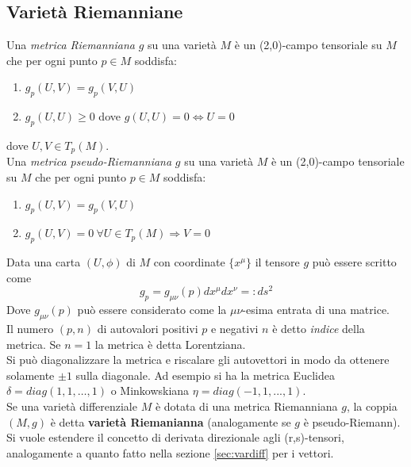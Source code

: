\subsection{Varietà Riemanniane}
\begin{definition}
   Una \emph{metrica Riemanniana} $g$ su una varietà $M$ è un (2,0)-campo tensoriale
   su $M$ che per ogni punto $p \in M$ soddisfa:
   \begin{enumerate}
      \item $ g_p(U,V) = g_p(V,U) $
      \item $ g_p(U,U) \geq 0 $ dove $ g(U,U) = 0 \iff U = 0$
   \end{enumerate}
   dove $U,V \in T_p(M)$.\\

   Una \emph{metrica pseudo-Riemanniana} $g$ su una varietà $M$ è un
   (2,0)-campo tensoriale su $M$ che per ogni punto $p \in M$ soddisfa:
   \begin{enumerate}
      \item $ g_p(U,V) = g_p(V,U) $
      \item $ g_p(U,V) = 0 \: \forall U \in T_p(M) \Rightarrow V = 0$
   \end{enumerate}
\end{definition}

Data una carta $(U,\phi)$ di $M$ con coordinate $\{x^\mu\}$ il tensore $g$ può
essere scritto come
$$ g_p = g_{\mu\nu}(p) dx^\mu dx^\nu =: ds^2$$
Dove $g_{\mu\nu}(p)$ può essere considerato come la $\mu\nu$-esima entrata di una matrice.\\
Il numero $(p,n)$ di autovalori positivi $p$ e negativi $n$ è detto \emph{indice} della
metrica. Se $n=1$ la metrica è detta Lorentziana.\\
Si può diagonalizzare la metrica e riscalare gli autovettori in modo da ottenere
solamente $\pm 1$ sulla diagonale. Ad esempio si ha la metrica Euclidea
$\delta = diag(1,1,\dots,1)$ o Minkowskiana $\eta = diag(-1,1,...,1)$.\\

Se una varietà differenziale $M$ è dotata di una metrica Riemanniana $g$, la coppia $(M,g)$
è detta \textbf{varietà Riemanianna} (analogamente se $g$ è pseudo-Riemann).\\


Si vuole estendere il concetto di derivata direzionale agli (r,s)-tensori,
analogamente a quanto fatto nella sezione \ref{sec:vardiff} per i vettori.\\

